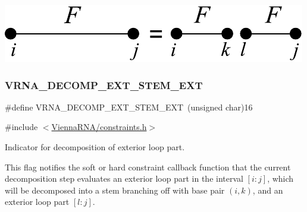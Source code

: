  
\begin{DoxyImageNoCaption}
  \mbox{\includegraphics[width=\textwidth,height=\textheight/2,keepaspectratio=true]{decomp_ext_ext_ext}}
\end{DoxyImageNoCaption}
 \mbox{\label{group__constraints_gabb09c5b78b75a44502fc77b950125c1e}} 
\subsubsection{\texorpdfstring{V\+R\+N\+A\+\_\+\+D\+E\+C\+O\+M\+P\+\_\+\+E\+X\+T\+\_\+\+S\+T\+E\+M\+\_\+\+E\+XT}{VRNA\_DECOMP\_EXT\_STEM\_EXT}}
{\footnotesize\ttfamily \#define V\+R\+N\+A\+\_\+\+D\+E\+C\+O\+M\+P\+\_\+\+E\+X\+T\+\_\+\+S\+T\+E\+M\+\_\+\+E\+XT~(unsigned char)16}



{\ttfamily \#include $<$\hyperlink{constraints_8h}{Vienna\+R\+N\+A/constraints.\+h}$>$}



Indicator for decomposition of exterior loop part. 

This flag notifies the soft or hard constraint callback function that the current decomposition step evaluates an exterior loop part in the interval $[i:j]$, which will be decomposed into a stem branching off with base pair $(i,k)$, and an exterior loop part $[l:j]$.

